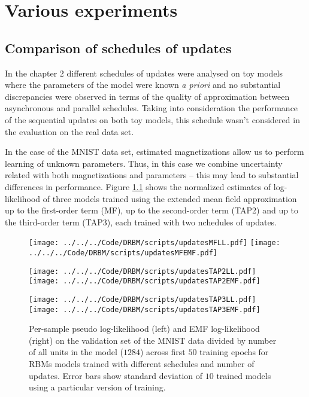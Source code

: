 \chapter{Various experiments}

\section{Comparison of schedules of updates}
In the chapter $2$ different schedules of updates were analysed on toy models where the parameters of the model were known \emph{a priori} and no substantial discrepancies were observed in terms of the quality of approximation between asynchronous and parallel schedules. Taking into consideration the performance of the sequential updates on both toy models, this schedule wasn't considered in the evaluation on the real data set.

In the case of the MNIST data set, estimated magnetizations allow us to perform learning of unknown parameters. Thus, in this case we combine uncertainty related with both magnetizations and parameters -- this may lead to substantial differences in performance. Figure \ref{fig:updatesLL} shows the normalized estimates of log-likelihood of three models trained using the extended mean field approximation up to the first-order term (MF), up to the second-order term (TAP2) and up to the third-order term (TAP3), each trained with two nchedules of updates.

\begin{figure}[!htb]
%
\texttt{[image: ../../../Code/DRBM/scripts/updatesMFLL.pdf]}
\endminipage 
{}  
 \texttt{[image: ../../../Code/DRBM/scripts/updatesMFEMF.pdf]}
\endminipage\hfill

%
 \texttt{[image: ../../../Code/DRBM/scripts/updatesTAP2LL.pdf]}
\endminipage 
{}  
\texttt{[image: ../../../Code/DRBM/scripts/updatesTAP2EMF.pdf]}
\endminipage\hfill

%
\texttt{[image: ../../../Code/DRBM/scripts/updatesTAP3LL.pdf]}
\endminipage 
{}  
\texttt{[image: ../../../Code/DRBM/scripts/updatesTAP3EMF.pdf]}
\endminipage\hfill
  \caption[Estimates of log-likelihood with different updates]{Per-sample pseudo log-likelihood (left) and EMF log-likelihood (right) on the validation set of the MNIST data divided by number of all units in the model ($1284$) across first $50$ training epochs for RBMs models trained with different schedules and number of updates. Error bars show standard deviation of $10$ trained models using a particular version of training.}
  \label{fig:updatesLL}
\end{figure}

